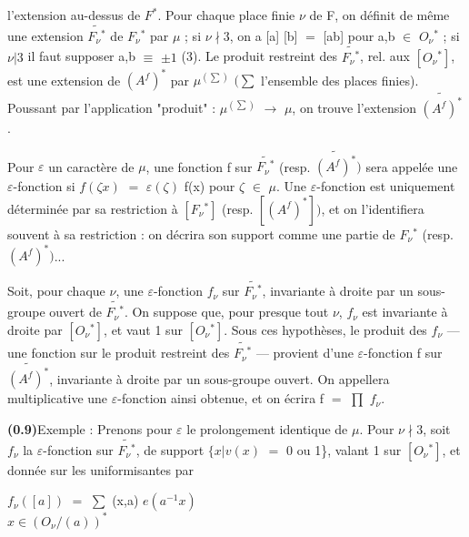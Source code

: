 \documentclass[10pt,a4paper]{article}
\begin{document}
\clearpage
{}
\label{d035-physical-004}
\par l'extension au-dessus de $F^*$. Pour chaque place finie $\nu{}$ de F, on définit de même une extension $\widetilde{F_\nu{}^*}$ de $F_\nu{}^*$ par $\mu{}$ ; si $\nu{}\nmid{}3$, on a [a] [b] $=$ [ab] pour a,b $\in{}$ $O_\nu{}^*$ ; si $\nu{}|3$ il faut supposer a,b $\equiv{}$ $\pm{}1$ (3). Le produit restreint des $\widetilde{F_\nu{}^*}$, rel. aux $[O_\nu{}^*]$, est une extension de $(A^f)^*$ par $\mu{}^{(\sum{})}$ $(\sum{}$ l'ensemble des places finies). Poussant par l'application "produit" : $\mu{}^{(\sum{})}$ $\to{}$ $\mu{}$, on trouve l'extension $\widetilde{(A^f)^*}$.\par
\par Pour $\varepsilon{}$ un caractère de $\mu{}$, une fonction f sur $\widetilde{F_\nu{}^*}$ (resp. $\widetilde{(A^f)^*})$ sera appelée une $\varepsilon{}$-fonction si $f(\zeta{}x)$ $=$ $\varepsilon{}(\zeta{})$ f(x) pour $\zeta{}$ $\in{}$ $\mu{}$. Une $\varepsilon{}$-fonction est uniquement déterminée par sa restriction à $[F_\nu{}^*]$ (resp. $[(A^f)^*])$, et on l'identifiera souvent à sa restriction : on décrira son support comme une partie de $F_\nu{}^*$ (resp. $(A^f)^*)$...\par
\par Soit, pour chaque $\nu{}$, une $\varepsilon{}$-fonction $f_\nu{}$ sur $\widetilde{F_\nu{}^*}$, invariante à droite par un sous-groupe ouvert de $\widetilde{F_\nu{}^*}$. On suppose que, pour presque tout $\nu{}$, $f_\nu{}$ est invariante à droite par $[O_\nu{}^*]$, et vaut 1 sur $[O_\nu{}^*]$. Sous ces hypothèses, le produit des $f_\nu{}$ --- une fonction sur le produit restreint des $\widetilde{F_\nu{}^*}$ --- provient d'une $\varepsilon{}$-fonction f sur $\widetilde{(A^f)^*}$, invariante à droite par un sous-groupe ouvert. On appellera multiplicative une $\varepsilon{}$-fonction ainsi obtenue, et on écrira f $=$ $\prod{}$ $f_\nu{}$.\par
\par\noindent\textbf{(0.9)}\quad Exemple : Prenons pour $\varepsilon{}$ le prolongement identique de $\mu{}$. Pour $\nu{}\nmid{}3$, soit $f_\nu{}$ la $\varepsilon{}$-fonction sur $\widetilde{F_\nu{}^*}$, de support $\{x|v(x)$ $=$ 0 ou 1\}, valant 1 sur $[O_\nu{}^*]$, et donnée sur les uniformisantes par\par
\par\smallskip\begin{center}\begin{minipage}{0.96\textwidth}\centering
$f_\nu{}([a])$ $=$ $\sum{}$ (x,a) $e(a^{-1}x)$ \\ $x\in{}(O_\nu{}/(a))^*$
\end{minipage}\end{center}\smallskip
\end{document}
